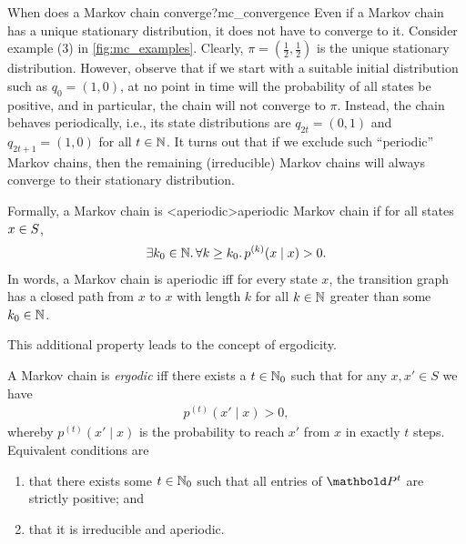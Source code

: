 \begin{rmk}{When does a Markov chain converge?}{mc_convergence}
  Even if a Markov chain has a unique stationary distribution, it does not have to converge to it.
  Consider example (3) in \cref{fig:mc_examples}.
  Clearly, $\pi = (\frac{1}{2}, \frac{1}{2})$ is the unique stationary distribution.
  However, observe that if we start with a suitable initial distribution such as $q_0 = (1,0)$, at no point in time will the probability of all states be positive, and in particular, the chain will not converge to $\pi$.
  Instead, the chain behaves periodically, i.e., its state distributions are $q_{2t} = (0,1)$ and $q_{2t+1} = (1,0)$ for all $t \in \mathbb{N}$.
  It turns out that if we exclude such ``periodic'' Markov chains, then the remaining (irreducible) Markov chains will always converge to their stationary distribution.

  Formally, a Markov chain is \midx<aperiodic>{aperiodic Markov chain} if for all states $x \in S$, \begin{align}
    \exists k_0 \in \mathbb{N}. \, \forall k \geq k_0. \, p^{(k)}(x \mid x) > 0.
  \end{align}
  In words, a Markov chain is aperiodic iff for every state $x$, the transition graph has a closed path from $x$ to $x$ with length $k$ for all $k \in \mathbb{N}$ greater than some $k_0 \in \mathbb{N}$.
\end{rmk}

This additional property leads to the concept of ergodicity.

\begin{defn}[Ergodicity]
  A Markov chain is \emph{ergodic} iff there exists a $t \in \mathbb{N}_0$ such that for any $x, x' \in S$ we have \begin{align}
    p^{(t)}(x' \mid x) > 0,
  \end{align} whereby $p^{(t)}(x' \mid x)$ is the probability to reach $x'$ from $x$ in exactly $t$ steps.
  Equivalent conditions are \begin{enumerate}
    \item that there exists some $t \in \mathbb{N}_0$ such that all entries of $\mP^t$ are strictly positive; and
    \item that it is irreducible and aperiodic.
  \end{enumerate}
\end{defn}

\begin{marginfigure}
  \caption{Transition graphs of Markov chains: (1) is not ergodic as its transition diagram is not strongly connected; (2) is not ergodic for the same reason; (3) is irreducible but periodic and therefore not ergodic; (4) is ergodic with stationary distribution $\pi(1) = \nicefrac{2}{3}, \pi(2) = \nicefrac{1}{3}$.}\label{fig:mc_examples}
\end{marginfigure}

